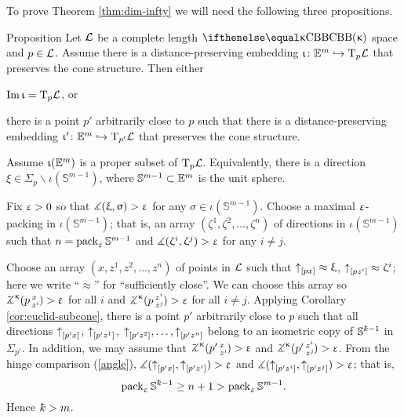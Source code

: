 To prove Theorem \ref{thm:dim-infty}  we will need the following three propositions.


\begin{thm}{Proposition}\label{E=T}
Let $\mathcal{L}$ be a complete length $\Alex{\kappa}$ space and $p\in \spc{L}$.
Assume there is a distance-preserving embedding $\iota\:\EE^{m}\hookrightarrow \T_p\spc{L}$ 
that preserves the cone structure.
Then either
\begin{subthm}{}
 $\mathop{\rm Im}\nolimits\upiota=\text{\rm T}_p\mathcal{L}$, or
\end{subthm}

\begin{subthm}{} there is a point $p'$ arbitrarily close to $p$ such that there is a distance-preserving embedding $\iota'\:\EE^{m}\hookrightarrow \T_{p'}\spc{L}$ 
that preserves the cone structure.
\end{subthm}
\end{thm}


Assume $\upiota(\mathbb{E}^{m})$ is a proper subset of $\text{\rm T}_p\mathcal{L}$.
Equivalently, there is a direction $\xi \in \Sigma_p\backslash\iota(\mathbb{S}^{m-1})$,
where $\mathbb{S}^{m-1}\subset \EE^m$ is the unit sphere. 

Fix $\upvarepsilon>0$ so that $\measuredangle(\upxi,\upsigma)>\upvarepsilon$ for any $\sigma\in \iota(\mathbb{S}^{m-1})$. 
Choose a maximal $\upvarepsilon$-packing in $\iota(\mathbb{S}^{m-1})$;
that is, an array  $(\zeta^1,\zeta^2,\dots,\zeta^n)$ of directions in $\iota(\mathbb{S}^{m-1})$ such that $n=\mathop{\rm pack}\nolimits_\upvarepsilon \mathbb{S}^{m-1}$ and $\measuredangle(\upzeta^i,\upzeta^j)>\upvarepsilon$ for any $i\not=j$.

Choose an array $(x,z^1,z^2,\dots,z^n)$  of points in $\mathcal{L}$ such that
$\dir p x\approx\xi$, $\dir p{z^i}\approx\zeta^i$; 
here we write ``$\approx$'' for ``sufficiently close''.
We can choose this array so 
$\angk{\kappa}p x{z^i}>\eps$ for all $i$ 
and $\angk{\kappa}p{z^i}{z^j}>\eps$ for all $i\not=j$.
Applying Corollary \ref{cor:euclid-subcone}, there is a point $p'$ arbitrarily close to  $p$ 
such that all directions ${\uparrow}_{[{p'}{x}]}$, ${\uparrow}_{[{p'}{z^1}]}$, $\dir{p'}{z^2},\dots,\dir{p'}{z^n}$
belong to an isometric copy of $\mathbb{S}^{\kay-1}$ in $\Sigma_{p'}$.
In addition, we may assume that $\angk{\kappa}{p'}x{z^i}>\eps$ and $\angk{\kappa}{p'}{z^i}{z^j}>\eps$.
From the hinge comparison (\ref{angle}),
$\measuredangle({\uparrow}_{[{p'}{x}]},{\uparrow}_{[{p'}{z^i}]})>\upvarepsilon$ 
and $\measuredangle({\uparrow}_{[{p'}{z^i}]},{\uparrow}_{[{p'}{z^j}]})>\upvarepsilon$;
that is, 
\[\pack_\eps \mathbb{S}^{\kay-1}\ge n+1>\pack_\eps \mathbb{S}^{m-1}.\] 
Hence $\kay>m$.
\qeds



